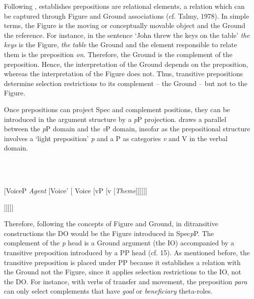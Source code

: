 \documentclass[output=paper,modfonts,nonflat]{langsci/langscibook}
\begin{document}
\begin{styleBodyTextii}
Following \citet{HaleKeyser2002}, \citet{Svenonius2004} establishes prepositions are relational elements, a relation which can be captured through Figure and Ground associations (cf. Talmy, 1978). In simple terms, the Figure is the moving or conceptually movable object and the Ground the reference. For instance, in the sentence ‘John threw the keys on the table’ \textit{the} \textit{keys} is the Figure, \textit{the} \textit{table} the Ground and the element responsible to relate them is the preposition \textit{on}. Therefore, the Ground is the complement of the preposition. Hence, the interpretation of the Ground depends on the preposition, whereas the interpretation of the Figure does not. Thus, transitive prepositions determine selection restrictions to its complement – the Ground – but not to the Figure.
\end{styleBodyTextii}

\begin{styleBodyTextii}
Once prepositions can project Spec and complement positions, they can be introduced in the argument structure by a \textit{p}P projection. \citet[180]{Wood2012} draws a parallel between the \textit{p}P domain and the \textit{v}P domain, insofar as the prepositional structure involves a ‘light preposition’ \textit{p} and a P as categories \textit{v} and V in the verbal domain.
\end{styleBodyTextii}

\begin{styleBodyTextii}
\ea%
    \label{ex:key:14}
    \gll\\
        \\
    \glt
    \z

         [VoiceP \textit{Agent} [Voice’ [ Voice [vP [v [\textit{Theme}]]]]]]
\end{styleBodyTextii}

\begin{styleBodyTextii}
         [pP \textit{Figure}        [p’         [p        [PP  [P [\textit{Ground}]]]]]]
\end{styleBodyTextii}

\begin{styleBodyTextii}
Therefore, following the concepts of Figure and Ground, in ditransitive constructions the DO would be the Figure introduced in Spec\textit{p}P. The complement of the \textit{p} head is a Ground argument (the IO) accompanied by a transitive preposition introduced by a PP head (cf. 15). As mentioned before, the transitive preposition is placed under PP because it establishes a relation with the Ground not the Figure, since it applies selection restrictions to the IO, not the DO. For instance, with verbs of transfer and movement, the preposition \textit{para} can only select complements that have \textit{goal} or \textit{beneficiary} theta-roles.
\end{styleBodyTextii}
\end{document}
